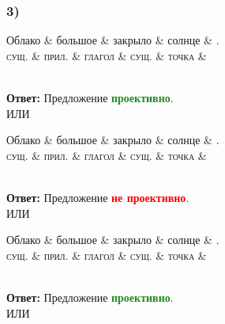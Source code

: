\documentclass[14pt,extrafontsizes]{article}
\begin{document}
\subsubsection*{3)}
\begin{dependency}[theme = simple]
\begin{deptext}[column sep=1em]
Облако \& большое \& закрыло \& солнце \& . \\
\textsc{сущ.} \& \textsc{прил.} \& \textsc{глагол} \& \textsc{сущ.} \& \textsc{точка} \&\\
\end{deptext}
\end{dependency}
\\
\textbf{Ответ: }Предложение \textcolor{ForestGreen}{\textbf{проективно}}.
\\
ИЛИ
\\
\begin{dependency}[theme = simple]
\begin{deptext}[column sep=1em]
Облако \& большое \& закрыло \& солнце \& . \\
\textsc{сущ.} \& \textsc{прил.} \& \textsc{глагол} \& \textsc{сущ.} \& \textsc{точка} \&\\
\end{deptext}
\end{dependency}
\\
\textbf{Ответ: }Предложение \textcolor{red}{\textbf{не проективно}}.
\\
ИЛИ
\\
\begin{dependency}[theme = simple]
\begin{deptext}[column sep=1em]
Облако \& большое \& закрыло \& солнце \& . \\
\textsc{сущ.} \& \textsc{прил.} \& \textsc{глагол} \& \textsc{сущ.} \& \textsc{точка} \&\\
\end{deptext}
\end{dependency}
\\
\textbf{Ответ: }Предложение \textcolor{ForestGreen}{\textbf{проективно}}.
\\
ИЛИ
\\
\end{document}
